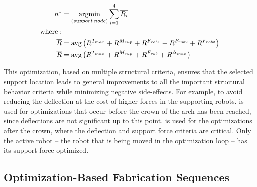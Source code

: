 \begin{align} \label{eq:opt}
	n^{\star} &= \operatorname*{argmin}_{(support \: node)} \sum_{i=1}^{4} \overline{R_i} \\
	\nonumber\text{where}: \\
	\overline{R} &= {\rm avg}\left( R^{T_{max}} + R^{M_{sup}} + R^{F_{rob1}} + R^{F_{rob2}} + R^{F_{rob3}}  \right)  \label{eq:opt2}\\
	\overline{R} &= {\rm avg}\left( R^{T_{max}} + R^{M_{sup}} + R^{F_{rob}} + R^{{\Delta_{max}}}  \right)  \label{eq:opt3}
\end{align}

This optimization, based on multiple structural criteria, ensures that the selected support location leads to general improvements to all the important structural behavior criteria while minimizing negative side-effects. For example, to avoid reducing the deflection at the cost of higher forces in the supporting robots.  is used for optimizations that occur before the crown of the arch has been reached, since deflections are not significant up to this point.  is used for the optimizations after the crown, where the deflection and support force criteria are critical. Only the active robot -- the robot that is being moved in the optimization loop -- has its support force optimized.  

\subsection{Optimization-Based Fabrication Sequences}\label{sec:optimization}

